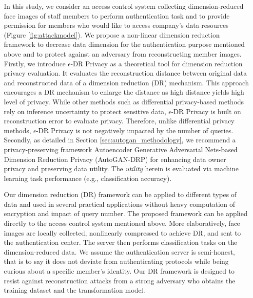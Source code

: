 In this study, we consider an access control system collecting dimension-reduced face images of staff members to perform authentication task and to provide permission for members who would like to access company's data resources (Figure \ref{fig:attackmodel}). We propose a non-linear dimension reduction framework to decrease data dimension for the authentication purpose mentioned above and to protect against an adversary from reconstructing member images. Firstly, we introduce $\epsilon$-DR Privacy as a theoretical tool for dimension reduction privacy evaluation. It evaluates the reconstruction distance between original data and reconstructed data of a dimension reduction (DR) mechanism. This approach encourages a DR mechanism to enlarge the distance as high distance yields high level of privacy. While other methods such as differential privacy-based methods rely on inference uncertainty to protect sensitive data, $\epsilon$-DR Privacy is built on reconstruction error to evaluate privacy. Therefore, unlike differential privacy methods,  $\epsilon$-DR Privacy is not negatively impacted by the number of queries. Secondly, as detailed in Section \ref{sec:autogan_methodology}, we recommend a privacy-preserving framework Autoencoder Generative Adversarial Nets-based Dimension Reduction Privacy (AutoGAN-DRP) for enhancing data owner privacy and preserving data utility. The \textit{utility} herein is evaluated via machine learning task performance (e.g., classification accuracy).

Our dimension reduction (DR) framework can be applied to different types of data and used in several practical applications without heavy computation of encryption and impact of query number. The proposed framework can be applied directly to the access control system mentioned above. More elaboratively, face images are locally collected, nonlinearly compressed to achieve DR, and sent to the authentication center. The server then performs classification tasks on the dimension-reduced data. We assume the authentication server is semi-honest, that is to say it does not deviate from authenticating protocols while being curious about a specific member's identity. Our DR framework is designed to resist against reconstruction attacks from a strong adversary who obtains the training dataset and the transformation model. 

